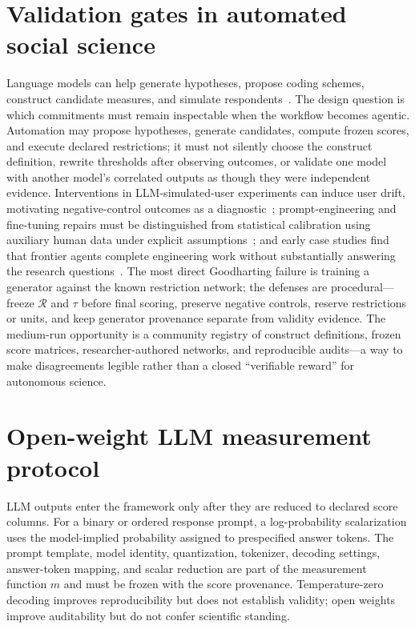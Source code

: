 \documentclass[10pt,letterpaper]{article}
\newcommand{\Rset}{\mathcal{R}}
\begin{document}
\section{Validation gates in automated social science}
\label{app:automation}

Language models can help generate hypotheses, propose coding schemes, construct candidate measures, and simulate respondents~\cite{manning2024}.
The design question is which commitments must remain inspectable when the workflow becomes agentic.
Automation may propose hypotheses, generate candidates, compute frozen scores, and execute declared restrictions; it must not silently choose the construct definition, rewrite thresholds after observing outcomes, or validate one model with another model's correlated outputs as though they were independent evidence.
Interventions in LLM-simulated-user experiments can induce user drift, motivating negative-control outcomes as a diagnostic~\cite{illusion2026}; prompt-engineering and fine-tuning repairs must be distinguished from statistical calibration using auxiliary human data under explicit assumptions~\cite{hullman2026}; and early case studies find that frontier agents complete engineering work without substantially answering the research questions~\cite{kirgis2026}.
The most direct Goodharting failure is training a generator against the known restriction network; the defenses are procedural---freeze $\Rset$ and $\tau$ before final scoring, preserve negative controls, reserve restrictions or units, and keep generator provenance separate from validity evidence.
The medium-run opportunity is a community registry of construct definitions, frozen score matrices, researcher-authored networks, and reproducible audits---a way to make disagreements legible rather than a closed ``verifiable reward'' for autonomous science.

\section{Open-weight LLM measurement protocol}
\label{app:llm}

LLM outputs enter the framework only after they are reduced to declared score columns.
For a binary or ordered response prompt, a log-probability scalarization uses the model-implied probability assigned to prespecified answer tokens.
The prompt template, model identity, quantization, tokenizer, decoding settings, answer-token mapping, and scalar reduction are part of the measurement function $m$ and must be frozen with the score provenance.
Temperature-zero decoding improves reproducibility but does not establish validity; open weights improve auditability but do not confer scientific standing.
\end{document}
